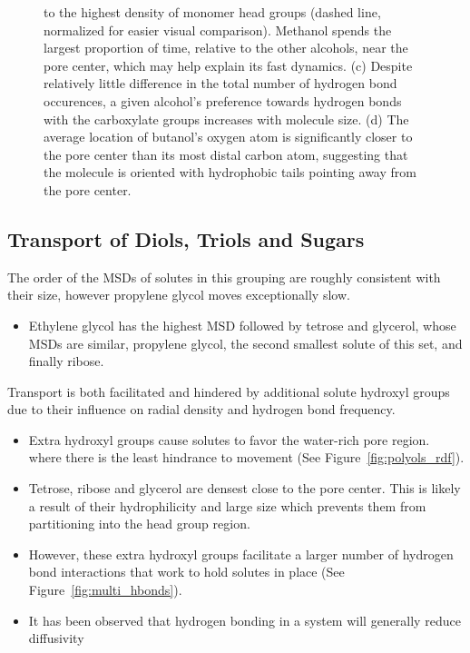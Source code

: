 \documentclass{article}
\begin{document}
\begin{figure}
{  to the highest density of monomer head groups (dashed line, normalized for easier visual
  comparison). Methanol spends the largest proportion of time, relative to the other alcohols,
  near the pore center, which may help explain its fast dynamics. (c) Despite relatively little
  difference in the total number of hydrogen bond occurences, a given alcohol's preference
  towards hydrogen bonds with the carboxylate groups increases with molecule size. (d) The average
  location of butanol's oxygen atom is significantly closer to the pore center than its most distal
  carbon atom, suggesting that the molecule is oriented with hydrophobic tails pointing away from
  the pore center.}\label{fig:simple_alcohols}
  \end{figure}

  \subsection*{Transport of Diols, Triols and Sugars}  %
  
  The order of the MSDs of solutes in this grouping are roughly consistent with 
  their size, however propylene glycol moves exceptionally slow.  %
  \begin{itemize}
  	\item Ethylene glycol has the highest MSD followed by tetrose
  	and glycerol, whose MSDs are similar, propylene glycol, the second smallest
  	solute of this set, and finally ribose.
  \end{itemize}
  
  Transport is both facilitated and hindered by additional solute hydroxyl groups
  due to their influence on radial density and hydrogen bond frequency.  	
  \begin{itemize} 
    \item Extra hydroxyl groups cause solutes to favor the water-rich pore region.
    where there is the least hindrance to movement (See Figure~\ref{fig:polyols_rdf}).
    \item Tetrose, ribose and glycerol are densest close to the pore center. This is 
    likely a result of their hydrophilicity and large size which prevents them from
    partitioning into the head group region.
    \item However, these extra hydroxyl groups facilitate a larger number of 
    hydrogen bond interactions that work to hold solutes in place (See Figure~\ref{fig:multi_hbonds}).
    \item It has been observed that hydrogen bonding in a system will generally
    reduce diffusivity~\cite{srinivas_computer_1999}
  \end{itemize}
  
\end{document}
